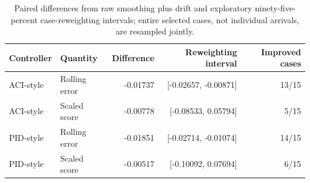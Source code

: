 \begin{table}[htbp]\centering\small
\caption{Paired differences from raw smoothing plus drift and exploratory ninety-five-percent case-reweighting intervals; entire selected cases, not individual arrivals, are resampled jointly.}\label{tab:case-reweighting}
\begin{tabular}{llrrr}\toprule
Controller & Quantity & Difference & Reweighting interval & Improved cases\\\midrule
ACI-style & Rolling error & -0.01737 & [-0.02657, -0.00871] & 13/15\\
ACI-style & Scaled score & -0.00778 & [-0.08533, 0.05794] & 5/15\\
PID-style & Rolling error & -0.01851 & [-0.02714, -0.01074] & 14/15\\
PID-style & Scaled score & -0.00517 & [-0.10092, 0.07694] & 6/15\\
\bottomrule\end{tabular}\end{table}

